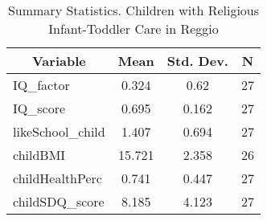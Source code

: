 
\begin{table}[htbp]\centering \caption{Summary Statistics. Children with Religious Infant-Toddler Care in Reggio \label{bothChildasiloReliReggio}}
\begin{tabular}{l c c  c}\hline\hline
\multicolumn{1}{c}{\textbf{Variable}} & \textbf{Mean}
 & \textbf{Std. Dev.} & \textbf{N}\\ \hline
IQ\_factor & 0.324 & 0.62  & 27\\
IQ\_score & 0.695 & 0.162  & 27\\
likeSchool\_child & 1.407 & 0.694  & 27\\
childBMI & 15.721 & 2.358  & 26\\
childHealthPerc & 0.741 & 0.447  & 27\\
childSDQ\_score & 8.185 & 4.123  & 27\\
\hline\end{tabular}
\end{table}
